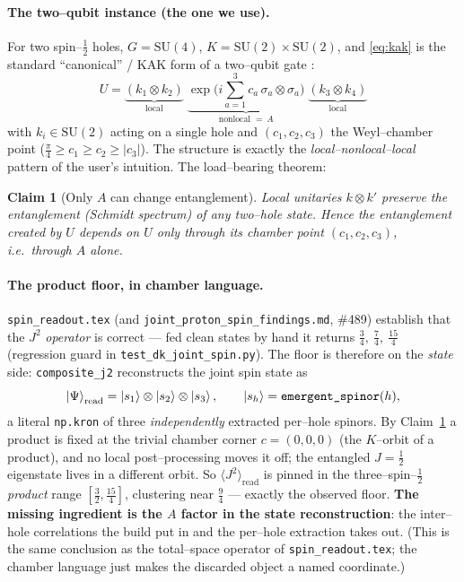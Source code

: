 \documentclass[11pt,oneside]{article}
\newcommand{\halff}{\tfrac{1}{2}}
\newcommand{\expval}[1]{\langle #1 \rangle}
\newcommand{\code}[1]{\texttt{#1}}
\newcommand{\SU}{\mathrm{SU}}
\theoremstyle{plain}
\newtheorem{claim}{Claim}
\begin{document}
\paragraph{The two--qubit instance (the one we use).}
For two spin--$\halff$ holes, $G=\SU(4)$, $K=\SU(2)\times\SU(2)$, and
\eqref{eq:kak} is the standard ``canonical'' / KAK form of a two--qubit gate
\cite{khaneja,kraus}:
\begin{equation}
  \boxed{\;U = \underbrace{(k_1\otimes k_2)}_{\text{local}}\;
              \underbrace{\exp\!\Big(i\textstyle\sum_{a=1}^{3} c_a\,
                          \sigma_a\!\otimes\!\sigma_a\Big)}_{\text{nonlocal }=\,A}\;
              \underbrace{(k_3\otimes k_4)}_{\text{local}}\;}
  \label{eq:kak2}
\end{equation}
with $k_i\in\SU(2)$ acting on a single hole and $(c_1,c_2,c_3)$ the Weyl--chamber
point ($\tfrac{\pi}{4}\ge c_1\ge c_2\ge|c_3|$). The structure is exactly the
\emph{local--nonlocal--local} pattern of the user's intuition. The load--bearing
theorem:
\begin{claim}[Only $A$ can change entanglement]\label{cl:onlyA}
Local unitaries $k\otimes k'$ preserve the entanglement (Schmidt spectrum) of any
two--hole state. Hence the entanglement created by $U$ depends on $U$ only through
its chamber point $(c_1,c_2,c_3)$, i.e.\ through $A$ alone.
\end{claim}

\paragraph{The product floor, in chamber language.}
\code{spin\_readout.tex} (and \code{joint\_proton\_spin\_findings.md}, \#489)
establish that the $J^2$ \emph{operator} is correct --- fed clean states by hand
it returns $\tfrac34,\ \tfrac74,\ \tfrac{15}{4}$ (regression guard in
\code{test\_dk\_joint\_spin.py}). The floor is therefore on the \emph{state} side:
\code{composite\_j2} reconstructs the joint spin state as
\begin{equation}
  \ket{\Psi}_{\text{read}} = \ket{s_1}\otimes\ket{s_2}\otimes\ket{s_3},
  \qquad \ket{s_h}=\code{emergent\_spinor}(h),
\end{equation}
a literal \code{np.kron} of three \emph{independently} extracted per--hole
spinors. By Claim~\ref{cl:onlyA} a product is fixed at the trivial chamber corner
$c=(0,0,0)$ (the $K$--orbit of a product), and no local post--processing moves it
off; the entangled $J=\halff$ eigenstate lives in a different orbit. So
$\expval{J^2}_{\text{read}}$ is pinned in the three--spin--$\halff$ \emph{product}
range $[\tfrac32,\tfrac{15}{4}]$, clustering near $\tfrac94$ --- exactly the
observed floor. \textbf{The missing ingredient is the $A$ factor in the state
reconstruction}: the inter--hole correlations the build put in and the per--hole
extraction takes out. (This is the same conclusion as the total--space operator of
\code{spin\_readout.tex}; the chamber language just makes the discarded object a
named coordinate.)
\end{document}
